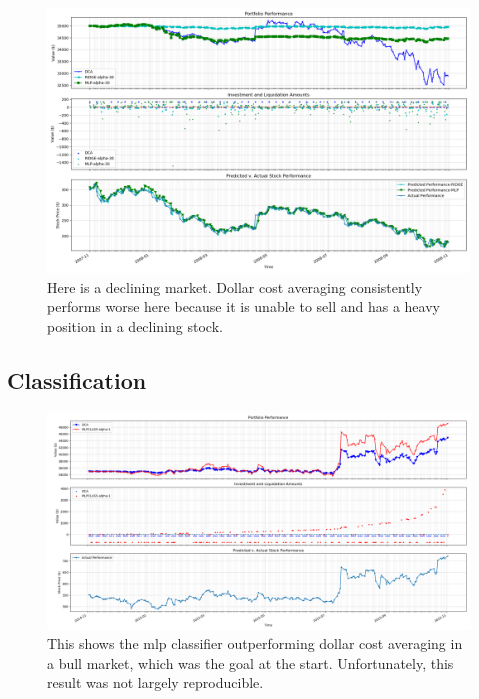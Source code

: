 \documentclass[12pt]{article}
\begin{document}
\begin{figure}
	\centering
	\includegraphics[width=0.7\linewidth]{../Results/GOOG-DCA-RIDGE-MLP-2007-11-01--2008-11-01-alphas--[30]-train_length-500-performanceplot}
	\caption{Here is a declining market. Dollar cost averaging consistently performs worse here because it is unable to sell and has a heavy position in a declining stock.}
	\label{fig:goog-dca-ridge-mlp-2007-11-01--2008-11-01-alphas--30-trainlength-500-performanceplot}
\end{figure}





\subsection{Classification}

\begin{figure}
	\centering
	\includegraphics[width=\linewidth]{../Results/victory}
	\caption{This shows the mlp classifier outperforming dollar cost averaging in a bull market, which was the goal at the start. Unfortunately, this result was not largely reproducible.}
	\label{fig:victory}
\end{figure}
\end{document}
